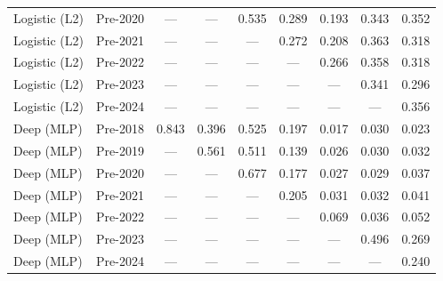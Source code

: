 \begin{table}[htbp]
{\begin{tabular}{l lccccccc}
Logistic (L2) & Pre-2020 & --- & --- & 0.535 & 0.289 & 0.193 & 0.343 & 0.352 \\
Logistic (L2) & Pre-2021 & --- & --- & --- & 0.272 & 0.208 & 0.363 & 0.318 \\
Logistic (L2) & Pre-2022 & --- & --- & --- & --- & 0.266 & 0.358 & 0.318 \\
Logistic (L2) & Pre-2023 & --- & --- & --- & --- & --- & 0.341 & 0.296 \\
Logistic (L2) & Pre-2024 & --- & --- & --- & --- & --- & --- & 0.356 \\
Deep (MLP) & Pre-2018 & 0.843 & 0.396 & 0.525 & 0.197 & 0.017 & 0.030 & 0.023 \\
Deep (MLP) & Pre-2019 & --- & 0.561 & 0.511 & 0.139 & 0.026 & 0.030 & 0.032 \\
Deep (MLP) & Pre-2020 & --- & --- & 0.677 & 0.177 & 0.027 & 0.029 & 0.037 \\
Deep (MLP) & Pre-2021 & --- & --- & --- & 0.205 & 0.031 & 0.032 & 0.041 \\
Deep (MLP) & Pre-2022 & --- & --- & --- & --- & 0.069 & 0.036 & 0.052 \\
Deep (MLP) & Pre-2023 & --- & --- & --- & --- & --- & 0.496 & 0.269 \\
Deep (MLP) & Pre-2024 & --- & --- & --- & --- & --- & --- & 0.240 \\
\bottomrule
\end{tabular}%
}
\end{table}